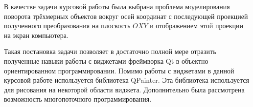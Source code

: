 
В качестве задачи курсовой работы была выбрана проблема моделирования поворота трёхмерных объектов вокруг осей координат с последующей проекцией полученного преобразования на плоскость $OXY$ и отображением этой проекции на экран компьютера.

Такая постановка задачи позволяет в достаточно полной мере отразить полученные навыки работы с виджетами фреймворка Qt в объектно-ориентированном программировании. Помимо работы с виджетами в данной курсовой работе используется библиотека QPainter. Эта библиотека используется для рисования на некоторой области виджета. Дополнительно была рассмотрена возможность многопоточного программирования.

\pagebreak


